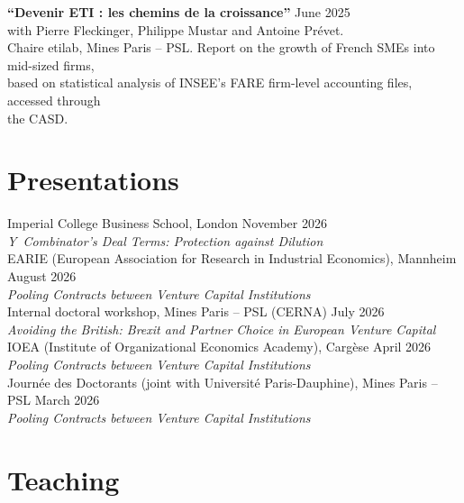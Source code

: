\documentclass[11pt,a4paper]{article}
\begin{document}
\textbf{``Devenir ETI : les chemins de la croissance''} \hfill June 2025 \\
with Pierre Fleckinger, Philippe Mustar and Antoine Prévet. \\
Chaire etilab, Mines Paris -- PSL. Report on the growth of French SMEs into
mid-sized firms, \\
based on statistical analysis of INSEE's FARE firm-level accounting files, accessed through \\
the CASD.

\section{Presentations}

Imperial College Business School, London \hfill November 2026 \\
\hspace{1em} \emph{Y~Combinator's Deal Terms: Protection against Dilution}
\\[0.4em]

EARIE (European Association for Research in Industrial Economics),
Mannheim \hfill August 2026 \\
\hspace{1em} \emph{Pooling Contracts between Venture Capital Institutions}
\\[0.4em]

Internal doctoral workshop, Mines Paris -- PSL (CERNA) \hfill July 2026 \\
\hspace{1em} \emph{Avoiding the British: Brexit and Partner Choice in European Venture Capital}
\\[0.4em]

IOEA (Institute of Organizational Economics Academy), Cargèse \hfill April 2026 \\
\hspace{1em} \emph{Pooling Contracts between Venture Capital Institutions}
\\[0.4em]

Journée des Doctorants (joint with Université Paris-Dauphine),
Mines Paris -- PSL \hfill March 2026 \\
\hspace{1em} \emph{Pooling Contracts between Venture Capital Institutions}

\section{Teaching}
\end{document}
